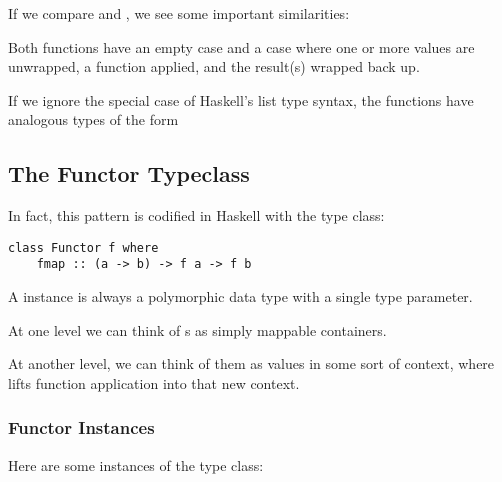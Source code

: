 If we compare  and , we see some important similarities:

\begin{notelist}
    \item Both functions have an empty case and a case where one or more values are unwrapped,
          a function applied, and the result(s) wrapped back up. 
    \item If we ignore the special case of Haskell's list type syntax, the functions have analogous types
          of the form 
\end{notelist}

\subsection{The Functor Typeclass}

In fact, this pattern is codified in Haskell with the  type class:

\begin{lstlisting}
class Functor f where
    fmap :: (a -> b) -> f a -> f b
\end{lstlisting}

\begin{notelist}
    \item A  instance is always a polymorphic data type with a single type parameter.
    \item At one level we can think of s as simply mappable containers.
    \item At another level, we can think of them as values in some sort of context, where 
          lifts function application into that new context.
\end{notelist}

\subsubsection{Functor Instances}

Here are some instances of the  type class:

